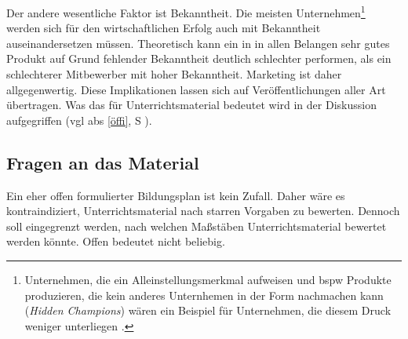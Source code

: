 Der andere wesentliche Faktor ist Bekanntheit. Die meisten Unternehmen\footnote{
    Unternehmen, die ein Alleinstellungsmerkmal aufweisen und \gls{bspw} Produkte produzieren, die kein anderes Unternhemen in der Form nachmachen kann (\emph{Hidden Champions}) wären ein Beispiel für Unternehmen, die diesem Druck weniger unterliegen \autocite{Simon.2007}. 
} werden sich für den wirtschaftlichen Erfolg auch mit Bekanntheit auseinandersetzen müssen. Theoretisch kann ein in in allen Belangen sehr gutes Produkt auf Grund fehlender Bekanntheit deutlich schlechter performen, als ein schlechterer Mitbewerber mit hoher Bekanntheit.  Marketing ist daher allgegenwertig. Diese Implikationen lassen sich auf Veröffentlichungen aller Art übertragen. Was das für Unterrichtsmaterial bedeutet wird in der Diskussion aufgegriffen (\gls{vgl} \gls{abs} \ref{öffi}, \gls{S} \pageref{öffi}).



\subsection{Fragen an das Material} %
Ein eher offen formulierter Bildungsplan ist kein Zufall. %
Daher wäre es kontraindiziert, Unterrichtsmaterial nach starren Vorgaben zu bewerten.
Dennoch soll eingegrenzt werden, nach welchen Maßstäben Unterrichtsmaterial bewertet werden könnte. Offen bedeutet nicht beliebig.

